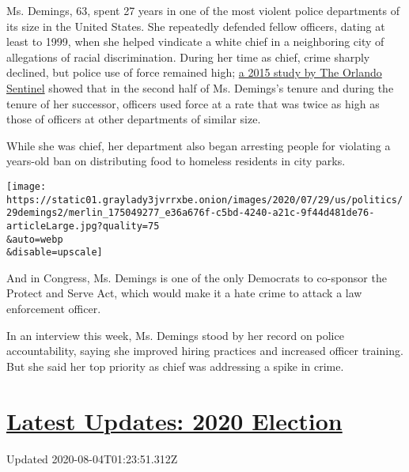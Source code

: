 Ms. Demings, 63, spent 27 years in one of the most violent police
departments of its size in the United States. She repeatedly defended
fellow officers, dating at least to 1999, when she helped vindicate a
white chief in a neighboring city of allegations of racial
discrimination. During her time as chief, crime sharply declined, but
police use of force remained high;
\href{http://interactive.orlandosentinel.com/focus-on-force/main/index.html}{a
2015 study by The Orlando Sentinel} showed that in the second half of
Ms. Demings's tenure and during the tenure of her successor, officers
used force at a rate that was twice as high as those of officers at
other departments of similar size.

While she was chief, her department also began arresting people for
violating a years-old ban on distributing food to homeless residents in
city parks.

\texttt{[image: https://static01.graylady3jvrrxbe.onion/images/2020/07/29/us/politics/29demings2/merlin\_175049277\_e36a676f-c5bd-4240-a21c-9f44d481de76-articleLarge.jpg?quality=75\\\&auto=webp\\\&disable=upscale]}

And in Congress, Ms. Demings is one of the only Democrats to co-sponsor
the Protect and Serve Act, which would make it a hate crime to attack a
law enforcement officer.

In an interview this week, Ms. Demings stood by her record on police
accountability, saying she improved hiring practices and increased
officer training. But she said her top priority as chief was addressing
a spike in crime.

\hypertarget{latest-updates-2020-election}{%
\section{\texorpdfstring{\href{https://www.nytimes3xbfgragh.onion/2020/08/03/us/elections/biden-vs-trump.html?action=click\&pgtype=Article\&state=default\&region=MAIN_CONTENT_1\&context=storylines_live_updates}{Latest
Updates: 2020
Election}}{Latest Updates: 2020 Election}}\label{latest-updates-2020-election}}

Updated 2020-08-04T01:23:51.312Z


